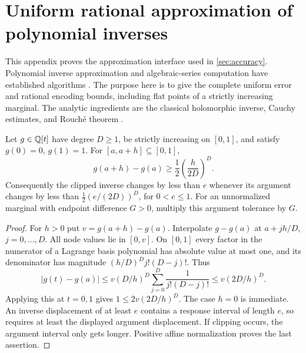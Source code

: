 \section{Uniform rational approximation of polynomial inverses}
\label{app:inverse}

This appendix proves the approximation interface used in
\cref{sec:accuracy}. Polynomial inverse approximation and algebraic-series
computation have established algorithms
\cite{Farouki2000,Walsh2000}. The purpose here is to give the complete
uniform error and rational encoding bounds, including flat points of a
strictly increasing marginal. The analytic ingredients are the classical
holomorphic inverse, Cauchy estimates, and Rouch\'e theorem
\cite{DLMFComplex}.

\begin{lemma}\label{lem:inverse-modulus}
Let $g\in\mathbb Q[t]$ have degree $D\ge1$, be strictly increasing on $[0,1]$,
and satisfy $g(0)=0$, $g(1)=1$. For $[a,a+h]\subseteq[0,1]$,
\begin{equation}\label{eq:inverse-increment}
             g(a+h)-g(a)\ge\frac12\left(\frac{h}{2D}\right)^D.
\end{equation}
Consequently the clipped inverse changes by less than $e$ whenever its
argument changes by less than $\frac12(e/(2D))^D$, for $0<e\le1$.
For an unnormalized marginal with endpoint difference $G>0$, multiply
this argument tolerance by $G$.
\end{lemma}
\begin{proof}
For $h>0$ put $v=g(a+h)-g(a)$. Interpolate $g-g(a)$ at
$a+jh/D$, $j=0,\ldots,D$. All node values lie in $[0,v]$.
On $[0,1]$ every factor in the numerator of a Lagrange basis polynomial
has absolute value at most one, and its denominator has magnitude
$(h/D)^D j!(D-j)!$. Thus
\[
 |g(t)-g(a)|\le v(D/h)^D\sum_{j=0}^D\frac1{j!(D-j)!}
              \le v(2D/h)^D.
\]
Applying this at $t=0,1$ gives $1\le2v(2D/h)^D$. The case $h=0$
is immediate. An inverse displacement of at least $e$ contains a
response interval of length $e$, so requires at least the displayed
argument displacement. If clipping occurs, the argument interval only
gets longer. Positive affine normalization proves the last assertion.
\end{proof}

